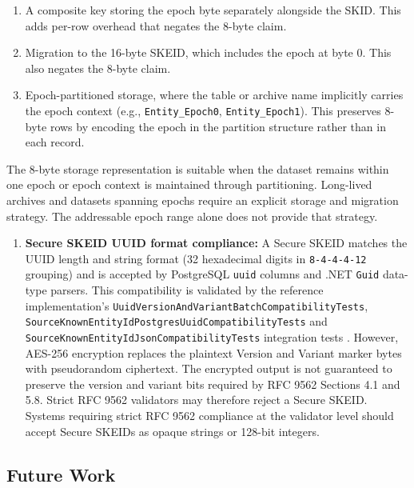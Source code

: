 \documentclass[a4paper,fleqn]{cas-sc}
\providecommand{\tightlist}{%
  \setlength{\itemsep}{0pt}\setlength{\parskip}{0pt}}
\begin{document}
\begin{enumerate}
  \begin{enumerate}
  \def\labelenumii{\arabic{enumii}.}
  \item
    A composite key storing the epoch byte separately alongside the
    SKID. This adds per-row overhead that negates the 8-byte claim.
  \item
    Migration to the 16-byte SKEID, which includes the epoch at byte 0.
    This also negates the 8-byte claim.
  \item
    Epoch-partitioned storage, where the table or archive name
    implicitly carries the epoch context (e.g., \texttt{Entity\_Epoch0},
    \texttt{Entity\_Epoch1}). This preserves 8-byte rows by encoding the
    epoch in the partition structure rather than in each record.
  \end{enumerate}
\end{enumerate}

The 8-byte storage representation is suitable when the dataset remains
within one epoch or epoch context is maintained through partitioning.
Long-lived archives and datasets spanning epochs require an explicit
storage and migration strategy. The addressable epoch range alone does
not provide that strategy.

\begin{enumerate}
\def\labelenumi{\arabic{enumi}.}
\setcounter{enumi}{5}
\tightlist
\item
  \textbf{Secure SKEID UUID format compliance:} A Secure SKEID matches
  the UUID length and string format (32 hexadecimal digits in
  \texttt{8-4-4-4-12} grouping) and is accepted by PostgreSQL
  \texttt{uuid} columns and .NET \texttt{Guid} data-type parsers. This
  compatibility is validated by the reference implementation's
  \texttt{UuidVersionAndVariantBatchCompatibilityTests},
  \texttt{SourceKnownEntityIdPostgresUuidCompatibilityTests} and
  \texttt{SourceKnownEntityIdJsonCompatibilityTests} integration tests
  \citep{drn-project}. However, AES-256 encryption replaces the
  plaintext Version and Variant marker bytes with pseudorandom
  ciphertext. The encrypted output is not guaranteed to preserve the
  version and variant bits required by RFC 9562 Sections 4.1 and 5.8.
  Strict RFC 9562 validators may therefore reject a Secure SKEID.
  Systems requiring strict RFC 9562 compliance at the validator level
  should accept Secure SKEIDs as opaque strings or 128-bit integers.
\end{enumerate}

\subsection{Future Work}\label{future-work}
\end{document}
